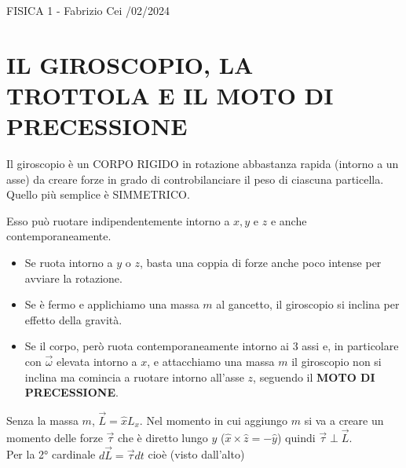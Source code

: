 \documentclass[12pt]{article}
\begin{document}
\begin{flushright}
FISICA 1 - Fabrizio Cei /02/2024
\end{flushright}

\section*{IL GIROSCOPIO, LA TROTTOLA E IL MOTO DI PRECESSIONE}
Il giroscopio è un CORPO RIGIDO in rotazione abbastanza rapida (intorno a un asse) da creare forze in grado di controbilanciare il peso di ciascuna particella. Quello più semplice è SIMMETRICO.

\vspace{0.5cm}
\begin{minipage}{0.35\textwidth}
\end{minipage}
\begin{minipage}{0.6\textwidth}
Esso può ruotare indipendentemente intorno a $x, y$ e $z$ e anche contemporaneamente.
\begin{itemize}
    \item Se ruota intorno a $y$ o $z$, basta una coppia di forze anche poco intense per avviare la rotazione.
    \item Se è fermo e applichiamo una massa $m$ al gancetto, il giroscopio si inclina per effetto della gravità.
\end{itemize}
\end{minipage}

\begin{itemize}
    \item Se il corpo, però ruota contemporaneamente intorno ai 3 assi e, in particolare con $\vec{\omega}$ elevata intorno a $x$, e attacchiamo una massa $m$ il giroscopio non si inclina ma comincia a ruotare intorno all'asse $z$, seguendo il \textbf{MOTO DI PRECESSIONE}.
\end{itemize}

Senza la massa $m$, $\vec{L} = \hat{x} L_x$. Nel momento in cui aggiungo $m$ si va a creare un momento delle forze $\vec{\tau}$ che è diretto lungo $y$ ($\hat{x} \times \hat{z} = -\hat{y}$) quindi $\vec{\tau} \perp \vec{L}$. \\
Per la 2° cardinale \quad $d\vec{L} = \vec{\tau} dt$ \quad cioè (visto dall'alto)
\end{document}

